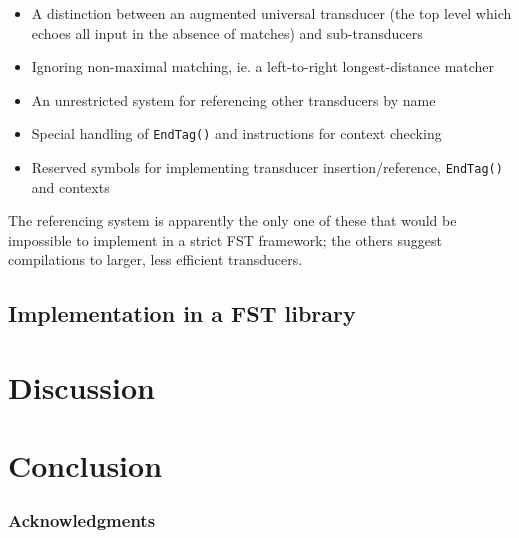 \documentclass{llncs}
\begin{document}
\begin{itemize}
\item A distinction between an augmented universal transducer (the top level
which echoes all input in the absence of matches) and sub-transducers
\item Ignoring non-maximal matching, ie. a left-to-right longest-distance
matcher
\item An unrestricted system for referencing other transducers by name
\item Special handling of \verb!EndTag()! and instructions for context
checking
\item Reserved symbols for implementing transducer insertion/reference,
\verb!EndTag()! and contexts
\end{itemize}

The referencing system is apparently the only one of these that would be
impossible to implement in a strict FST framework; the others suggest
compilations to larger, less efficient transducers.

\subsection{Implementation in a FST library}

\section{Discussion}

\section{Conclusion}

\subsubsection*{Acknowledgments}




\end{document}
